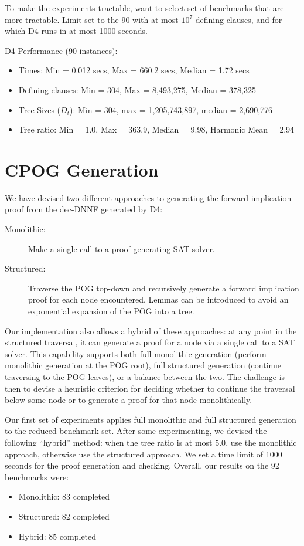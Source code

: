 \documentclass[twoside,11pt]{article}
\begin{document}
To make the experiments tractable, want to select set of benchmarks that are more tractable.
Limit set to the 90 with at most $10^7$ defining clauses, and for which D4 runs in at most 1000 seconds.

D4 Performance (90 instances):
       \begin{itemize}
       \item Times: Min = 0.012 secs, Max = 660.2 secs, Median = 1.72 secs
       \item Defining clauses: Min = 304, Max = 8,493,275, Median = 378,325
       \item Tree Sizes ($D_t$): Min = 304, max = 1,205,743,897, median = 2,690,776
       \item Tree ratio: Min = 1.0, Max = 363.9, Median = 9.98, Harmonic Mean = 2.94
       \end{itemize}

\section*{CPOG Generation}

We have devised two different approaches to generating the forward implication proof from the dec-DNNF generated by {\sc D4}:
\begin{description}
\item[Monolithic:] Make a single call to a proof generating SAT solver.
\item[Structured:] Traverse the POG top-down and recursively generate a forward implication proof for each node encountered.  Lemmas can be introduced to avoid an exponential expansion of the POG into a tree.
\end{description}

Our implementation also allows a hybrid of these approaches: at any
point in the structured traversal, it can generate a proof for a node via a
single call to a SAT solver.  This capability supports both full
monolithic generation (perform monolithic generation at the POG root),
full structured generation (continue traversing to the POG leaves), or
a balance between the two.
The challenge is then to devise a
heuristic criterion for deciding whether to continue the traversal below
some node or to generate a proof for that node monolithically.

Our first set of experiments applies full monolithic and full structured generation to the reduced benchmark set.  
After some experimenting, we devised the following ``hybrid'' method: when the tree ratio is at most $5.0$, use the monolithic approach, otherwise use the structured approach.
We set a time limit of 1000 seconds for the proof generation and checking.
Overall, our results on the 92 benchmarks were:
\begin{itemize}
\item Monolithic: 83 completed
\item Structured: 82 completed
\item Hybrid: 85 completed
\end{itemize}
\end{document}
